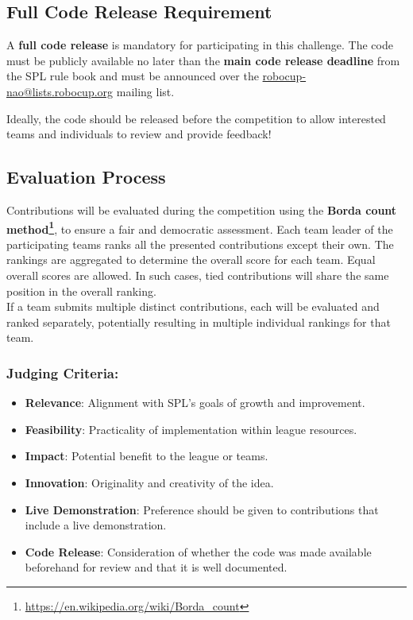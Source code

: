 \subsection{Full Code Release Requirement}
A \textbf{full code release} is mandatory for participating in this challenge. The code must be publicly available no later than the \textbf{main code release deadline} from the SPL rule book and must be announced over the \url{robocup-nao@lists.robocup.org} mailing list.

Ideally, the code should be released before the competition to allow interested teams and individuals to review and provide feedback!



\subsection{Evaluation Process}
Contributions will be evaluated during the competition using the \textbf{Borda count method\footnote{\url{https://en.wikipedia.org/wiki/Borda_count}}}, to ensure a fair and democratic assessment. Each team leader of the participating teams ranks all the presented contributions except their own. The rankings are aggregated to determine the overall score for each team. Equal overall scores are allowed. In such cases, tied contributions will share the same position in the overall ranking.\\
If a team submits multiple distinct contributions, each will be evaluated and ranked separately, potentially resulting in multiple individual rankings for that team.

\subsubsection*{Judging Criteria:}
\begin{itemize}
    \item \textbf{Relevance}: Alignment with SPL’s goals of growth and improvement.
    \item \textbf{Feasibility}: Practicality of implementation within league resources.
    \item \textbf{Impact}: Potential benefit to the league or teams.
    \item \textbf{Innovation}: Originality and creativity of the idea.
    \item \textbf{Live Demonstration}: Preference should be given to contributions that include a live demonstration.
    \item \textbf{Code Release}: Consideration of whether the code was made available beforehand for review and that it is well documented.
\end{itemize}


